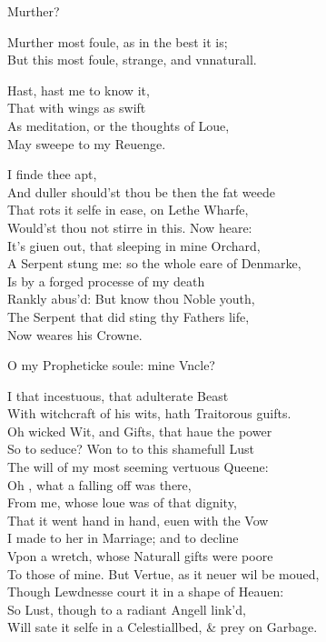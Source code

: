 \documentclass[a5paper,DIV=calc,11pt]{scrbook}
\begin{document}
\begin{drama*}
    \hamspeaks Murther?
    
    \ghospeaks Murther most foule, as in the best it is;\\
    But this most foule, strange, and vnnaturall.
    
    \hamspeaks Hast, hast me to know it,\\
    That with wings as swift\\
    As meditation, or the thoughts of Loue,\\
    May sweepe to my Reuenge.
    
    \ghospeaks I finde thee apt,\\
    And duller should'st thou be then the fat weede\\
    That rots it selfe in ease, on Lethe Wharfe,\\
    Would'st thou not stirre in this. Now \ham heare:\\
    It's giuen out, that sleeping in mine Orchard,\\
    A Serpent stung me: so the whole eare of Denmarke,\\
    Is by a forged processe of my death\\
    Rankly abus'd: But know thou Noble youth,\\
    The Serpent that did sting thy Fathers life,\\
    Now weares his Crowne.
    
    \hamspeaks O my Propheticke soule: mine Vncle?
    
    \ghospeaks I that incestuous, that adulterate Beast\\
    With witchcraft of his wits, hath Traitorous guifts.\\
    Oh wicked Wit, and Gifts, that haue the power\\
    So to seduce? Won to to this shamefull Lust\\
    The will of my most seeming vertuous Queene:\\
    Oh \ham, what a falling off was there,\\
    From me, whose loue was of that dignity,\\
    That it went hand in hand, euen with the Vow\\
    I made to her in Marriage; and to decline\\
    Vpon a wretch, whose Naturall gifts were poore\\
    To those of mine. But Vertue, as it neuer wil be moued,\\
    Though Lewdnesse court it in a shape of Heauen:\\
    So Lust, though to a radiant Angell link'd,\\
    Will sate it selfe in a Celestiallbed, \& prey on Garbage.
    

\end{drama*}
\end{document}
